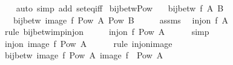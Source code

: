 \begin{isabellebody}
%
\isadelimproof
\ \ %
\endisadelimproof
%
\isatagproof
{}\isamarkupfalse%
\ {\isacharparenleft}{\kern0pt}auto\ simp\ add{\isacharcolon}{\kern0pt}\ set{\isacharunderscore}{\kern0pt}eq{\isacharunderscore}{\kern0pt}iff{\isacharparenright}{\kern0pt}%
\endisatagproof
{\isafoldproof}%
%
\isadelimproof
\isanewline
%
\endisadelimproof
\isanewline
{}\isamarkupfalse%
\ bij{\isacharunderscore}{\kern0pt}betw{\isacharunderscore}{\kern0pt}Pow{\isacharcolon}{\kern0pt}\isanewline
\ \ \ {\isachardoublequoteopen}bij{\isacharunderscore}{\kern0pt}betw\ f\ A\ B{\isachardoublequoteclose}\isanewline
\ \ \ {\isachardoublequoteopen}bij{\isacharunderscore}{\kern0pt}betw\ {\isacharparenleft}{\kern0pt}image\ f{\isacharparenright}{\kern0pt}\ {\isacharparenleft}{\kern0pt}Pow\ A{\isacharparenright}{\kern0pt}\ {\isacharparenleft}{\kern0pt}Pow\ B{\isacharparenright}{\kern0pt}{\isachardoublequoteclose}\isanewline
%
\isadelimproof
%
\endisadelimproof
%
\isatagproof
{}\isamarkupfalse%
\ {\isacharminus}{\kern0pt}\isanewline
\ \ \isamarkupfalse%
\ assms\ \isamarkupfalse%
\ {\isachardoublequoteopen}inj{\isacharunderscore}{\kern0pt}on\ f\ A{\isachardoublequoteclose}\isanewline
\ \ \ \ \isamarkupfalse%
\ {\isacharparenleft}{\kern0pt}rule\ bij{\isacharunderscore}{\kern0pt}betw{\isacharunderscore}{\kern0pt}imp{\isacharunderscore}{\kern0pt}inj{\isacharunderscore}{\kern0pt}on{\isacharparenright}{\kern0pt}\isanewline
\ \ \isamarkupfalse%
\ \isamarkupfalse%
\ {\isachardoublequoteopen}inj{\isacharunderscore}{\kern0pt}on\ f\ {\isacharparenleft}{\kern0pt}{\isasymUnion}{\isacharparenleft}{\kern0pt}Pow\ A{\isacharparenright}{\kern0pt}{\isacharparenright}{\kern0pt}{\isachardoublequoteclose}\isanewline
\ \ \ \ \isamarkupfalse%
\ simp\isanewline
\ \ \isamarkupfalse%
\ \isamarkupfalse%
\ {\isachardoublequoteopen}inj{\isacharunderscore}{\kern0pt}on\ {\isacharparenleft}{\kern0pt}image\ f{\isacharparenright}{\kern0pt}\ {\isacharparenleft}{\kern0pt}Pow\ A{\isacharparenright}{\kern0pt}{\isachardoublequoteclose}\isanewline
\ \ \ \ \isamarkupfalse%
\ {\isacharparenleft}{\kern0pt}rule\ inj{\isacharunderscore}{\kern0pt}on{\isacharunderscore}{\kern0pt}image{\isacharparenright}{\kern0pt}\isanewline
\ \ \isamarkupfalse%
\ \isamarkupfalse%
\ {\isachardoublequoteopen}bij{\isacharunderscore}{\kern0pt}betw\ {\isacharparenleft}{\kern0pt}image\ f{\isacharparenright}{\kern0pt}\ {\isacharparenleft}{\kern0pt}Pow\ A{\isacharparenright}{\kern0pt}\ {\isacharparenleft}{\kern0pt}image\ f\ {\isacharbackquote}{\kern0pt}\ Pow\ A{\isacharparenright}{\kern0pt}{\isachardoublequoteclose}\isanewline

\end{isabellebody}
